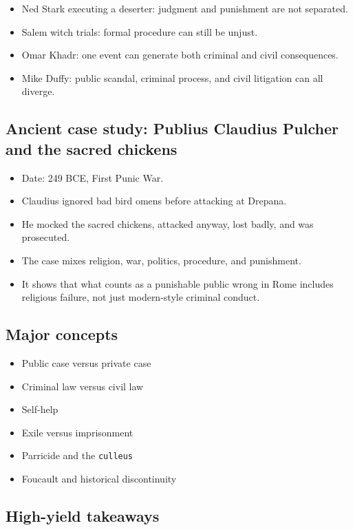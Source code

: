\documentclass[11pt]{article}
\begin{document}
\begin{itemize}
\item Ned Stark executing a deserter: judgment and punishment are not separated.
\item Salem witch trials: formal procedure can still be unjust.
\item Omar Khadr: one event can generate both criminal and civil consequences.
\item Mike Duffy: public scandal, criminal process, and civil litigation can all diverge.
\end{itemize}

\subsection{Ancient case study: Publius Claudius Pulcher and the sacred chickens}

\begin{itemize}
\item Date: 249 BCE, First Punic War.
\item Claudius ignored bad bird omens before attacking at Drepana.
\item He mocked the sacred chickens, attacked anyway, lost badly, and was prosecuted.
\item The case mixes religion, war, politics, procedure, and punishment.
\item It shows that what counts as a punishable public wrong in Rome includes religious failure, not just modern-style criminal conduct.
\end{itemize}

\subsection{Major concepts}

\begin{itemize}
\item Public case versus private case
\item Criminal law versus civil law
\item Self-help
\item Exile versus imprisonment
\item Parricide and the \texttt{culleus}
\item Foucault and historical discontinuity
\end{itemize}

\subsection{High-yield takeaways}
\end{document}
